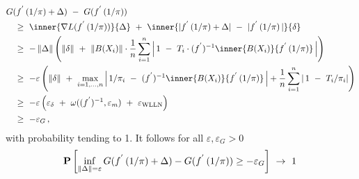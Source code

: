  \begin{align*}
   &
     G
     (
      f ^ { ' }
      \left( 
        1 / \pi 
      \right)
      +
      \Delta
     )
     \ 
     -
     \ 
     G
     (
      f ^ { ' }
      \left( 
        1 / \pi 
      \right)
     )
     \\
     &
     \quad
     \ge
     \ 
     \inner
     {
     \nabla 
     L
     (
      f ^ { ' }
      \left( 
        1 / \pi 
      \right)
     )
     }
     {
     \Delta
     }
     \ 
     +
     \ 
     \inner
     {
      | 
      f ^ { ' }
      \left( 
        1 / \pi 
      \right)
      +
      \Delta
     |
     \ 
      -
     \ 
     | 
      f ^ { ' }
      \left( 
        1 / \pi 
      \right)
     |
     }
     { \delta }
     \\
     &
     \quad
     \ge
     \ 
     -
     \norm{\Delta}
     \left( 
     \norm{\delta}
     \ 
     +
     \ 
     \norm{B(X_i)}
     \cdot
     \frac{1}{n}
     \sum_{i=1}^{n} 
     \left| 
     \,
      1
     \ 
      -
     \ 
        T_i
        \cdot
     (f ^ { ' }) ^ { -1 }
          \inner
          {B(X_i)}
          {
      f ^ { ' }
      \left( 
        1 / \pi 
      \right)
          }
          \,
     \right|
     \right)
     \\
     &
     \quad
     \ge
     \ 
     -
     \varepsilon
     \left( 
     \norm{\delta}
     \ 
     +
     \ 
     \max _ { i = 1,\ldots,n }
     \left| 
     \,
      1
      /
      \pi_i
     \ 
      -
     \ 
     (f ^ { ' }) ^ { -1 }
          \inner
          {B(X_i)}
          {
      f ^ { ' }
      \left( 
        1 / \pi 
      \right)
          }
          \,
     \right|
     +
     \frac{1}{n}
     \sum_{i=1}^{n} 
     \left| 
     \,
     1
     \ 
      -
     \ 
      T_i
      /
      \pi_i
     \right|
     \right)
     \\
     &
     \quad
     \ge
     \ 
     -
     \varepsilon
     \left( 
     \varepsilon _ {\delta}
     \ 
     +
     \ 
     \omega (
     (f ^ { ' }) ^ { -1 }
     ,
     \varepsilon _ m
     )
     \ 
     +
     \ 
     \varepsilon _ {\mathrm{WLLN}}
     \right)
     \\
     &
     \quad
     \ge
     \ 
     - \varepsilon _ G
     \,,
 \end{align*}
 with probability tending to 1.
 It follows
 for all $\varepsilon, \varepsilon_G > 0 $
 \begin{gather*}
   \P
   \left[ 
     \inf _ { \norm{\Delta} = \varepsilon }
     G
     (
      f ^ { ' }
      \left( 
        1 / \pi 
      \right)
      +
      \Delta
     )
     -
     G
     (
      f ^ { ' }
      \left( 
        1 / \pi 
      \right)
     )
     \ge 
     - \varepsilon_G
   \right]
   \ 
   \to 
   \ 
   1
   \,
 \end{gather*}
